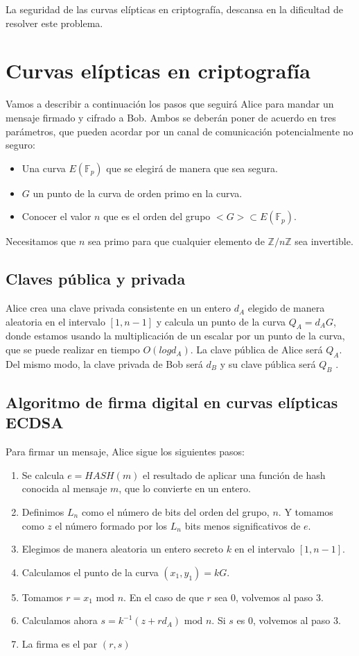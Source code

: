 \documentclass{article}
\begin{document}
La seguridad de las curvas elípticas en criptografía, descansa en la
dificultad de resolver este problema.

\section{Curvas elípticas en criptografía}

Vamos a describir a continuación los pasos que seguirá Alice para
mandar un mensaje firmado y cifrado a Bob. Ambos se deberán poner de
acuerdo en tres parámetros, que pueden acordar por un canal de
comunicación potencialmente no seguro:

\begin{itemize}
\item Una curva $E(\mathbb{F}_p)$ que se elegirá de manera que sea
segura.
\item $G$ un punto de la curva de orden primo en la curva.
\item Conocer el valor $n$ que es el orden del grupo $<G>\subset
E(\mathbb{F}_p)$.
\end{itemize}

Necesitamos que $n$ sea primo para que cualquier elemento de
$\mathbb{Z}/n\mathbb{Z}$ sea invertible.

\subsection{Claves pública y privada} Alice crea una clave privada
consistente en un entero $d_A$ elegido de manera aleatoria en el
intervalo $[1,n-1]$ y calcula un punto de la curva $Q_A=d_AG$, donde
estamos usando la multiplicación de un escalar por un punto de la
curva, que se puede realizar en tiempo $O(log d_A)$. La clave pública
de Alice será $Q_A$. Del mismo modo, la clave privada de Bob será
$d_B$ y su clave pública será $Q_B$ .

\subsection{Algoritmo de firma digital en curvas elípticas ECDSA}

Para firmar un mensaje, Alice sigue los siguientes pasos:

\begin{enumerate}
\item Se calcula $e=HASH(m)$ el resultado de aplicar una función de
hash conocida al mensaje $m$, que lo convierte en un entero.
\item Definimos $L_n$ como el número de bits del orden del grupo,
$n$. Y tomamos como $z$ el número formado por los $L_n$ bits menos
significativos de $e$.
\item Elegimos de manera aleatoria un entero secreto $k$ en el
intervalo $[1,n-1]$.
\item Calculamos el punto de la curva $(x_1, y_1)=kG$.
\item Tomamos $r = x_1 \text{ mod }n$. En el caso de que $r$ sea 0,
volvemos al paso 3.
\item Calculamos ahora $s=k^{-1}(z+rd_A) \text{ mod }n$. Si $s$ es 0,
volvemos al paso 3.
\item La firma es el par $(r,s)$
\end{enumerate}
\end{document}
